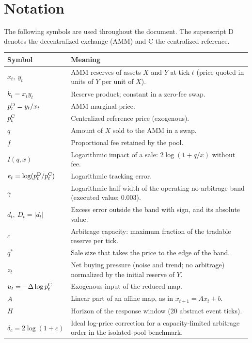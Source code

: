 \chapter*{Notation}

The following symbols are used throughout the document. The superscript $\mathrm{D}$ denotes the decentralized exchange (AMM) and $\mathrm{C}$ the centralized reference.

\begin{center}
\small
\begin{tabularx}{\textwidth}{@{}l X@{}}
\toprule
Symbol & Meaning \\
\midrule
$x_t,\ y_t$ & AMM reserves of assets $X$ and $Y$ at tick $t$ (price quoted in units of $Y$ per unit of $X$). \\
$k_t = x_t y_t$ & Reserve product; constant in a zero-fee swap. \\
$p^{\mathrm{D}}_t = y_t/x_t$ & AMM marginal price. \\
$p^{\mathrm{C}}_t$ & Centralized reference price (exogenous). \\
$q$ & Amount of $X$ sold to the AMM in a swap. \\
$f$ & Proportional fee retained by the pool. \\
$I(q,x)$ & Logarithmic impact of a sale: $2\log(1+q/x)$ without fee. \\
$e_t = \log(p^{\mathrm{D}}_t/p^{\mathrm{C}}_t)$ & Logarithmic tracking error. \\
$\gamma$ & Logarithmic half-width of the operating no-arbitrage band (executed value: $0.003$). \\
$d_t,\ D_t = |d_t|$ & Excess error outside the band with sign, and its absolute value. \\
$c$ & Arbitrage capacity: maximum fraction of the tradable reserve per tick. \\
$q^{\ast}$ & Sale size that takes the price to the edge of the band. \\
$z_t$ & Net buying pressure (noise and trend; no arbitrage) normalized by the initial reserve of $Y$. \\
$u_t = -\Delta\log p^{\mathrm{C}}_t$ & Exogenous input of the reduced map. \\
$A$ & Linear part of an affine map, as in $x_{t+1}=Ax_t+b$. \\
$H$ & Horizon of the response window (20 abstract event ticks). \\
$\delta_c=2\log(1+c)$ & Ideal log-price correction for a capacity-limited arbitrage order in the isolated-pool benchmark. \\

\end{tabularx}
\end{center}
